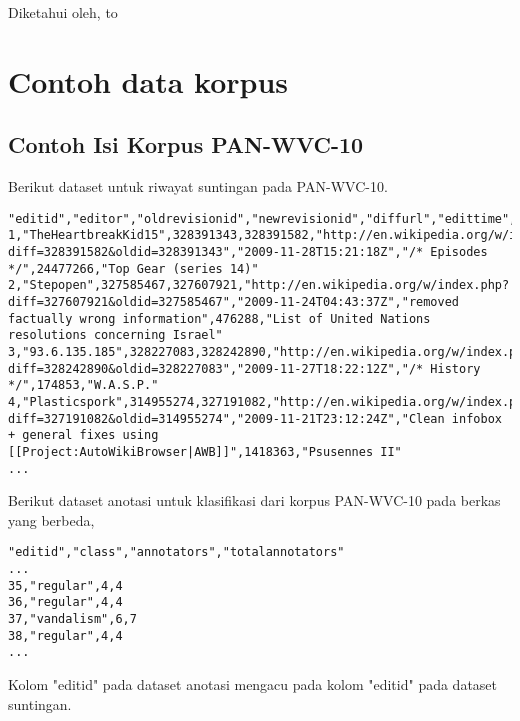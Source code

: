 \vfill
\begin{center}
	Diketahui oleh,
	\linebreak
	\linebreak
	\hbox to 
\end{center}

\newpage
\appendix
\section{Contoh data korpus}

\subsection{Contoh Isi Korpus PAN-WVC-10}

Berikut dataset untuk riwayat suntingan pada PAN-WVC-10.

\begin{lstlisting}
"editid","editor","oldrevisionid","newrevisionid","diffurl","edittime","editcomment","articleid","articletitle"
1,"TheHeartbreakKid15",328391343,328391582,"http://en.wikipedia.org/w/index.php?diff=328391582&oldid=328391343","2009-11-28T15:21:18Z","/* Episodes */",24477266,"Top Gear (series 14)"
2,"Stepopen",327585467,327607921,"http://en.wikipedia.org/w/index.php?diff=327607921&oldid=327585467","2009-11-24T04:43:37Z","removed factually wrong information",476288,"List of United Nations resolutions concerning Israel"
3,"93.6.135.185",328227083,328242890,"http://en.wikipedia.org/w/index.php?diff=328242890&oldid=328227083","2009-11-27T18:22:12Z","/* History */",174853,"W.A.S.P."
4,"Plasticspork",314955274,327191082,"http://en.wikipedia.org/w/index.php?diff=327191082&oldid=314955274","2009-11-21T23:12:24Z","Clean infobox + general fixes using [[Project:AutoWikiBrowser|AWB]]",1418363,"Psusennes II"
...
\end{lstlisting}

Berikut dataset anotasi untuk klasifikasi dari korpus PAN-WVC-10 pada berkas yang berbeda,

\begin{lstlisting}
"editid","class","annotators","totalannotators"
...
35,"regular",4,4
36,"regular",4,4
37,"vandalism",6,7
38,"regular",4,4
...
\end{lstlisting}

Kolom "editid" pada dataset anotasi mengacu pada kolom "editid" pada dataset suntingan.

